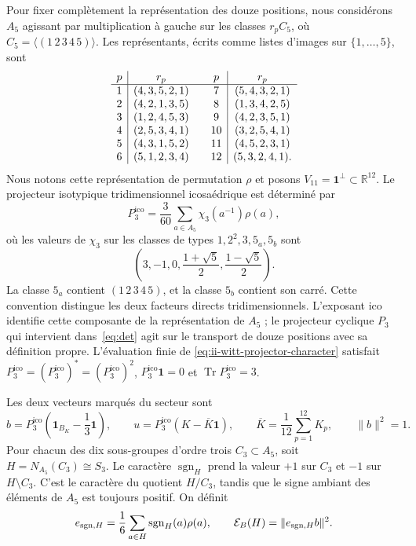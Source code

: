 Pour fixer complètement la représentation des douze positions,
nous considérons \(A_5\) agissant par multiplication à gauche sur les
classes \(r_pC_5\), où \(C_5=\langle(1\,2\,3\,4\,5)\rangle\).
Les représentants, écrits comme listes d’images sur
\(\{1,\ldots,5\}\), sont
\[
\begin{array}{c|c@{\qquad}c|c}
p&r_p&p&r_p\\ \hline
1&(4,3,5,2,1)&7&(5,4,3,2,1)\\
2&(4,2,1,3,5)&8&(1,3,4,2,5)\\
3&(1,2,4,5,3)&9&(4,2,3,5,1)\\
4&(2,5,3,4,1)&10&(3,2,5,4,1)\\
5&(4,3,1,5,2)&11&(4,5,2,3,1)\\
6&(5,1,2,3,4)&12&(5,3,2,4,1).
\end{array}
\]
Nous notons cette représentation de permutation \(\rho\) et posons
\(V_{11}=\mathbf1^\perp\subset\mathbb R^{12}\). Le projecteur
isotypique tridimensionnel icosaédrique est déterminé par
\begin{equation}
 P_3^{\mathrm{ico}}=\frac3{60}\sum_{a\in A_5}\chi_3(a^{-1})\rho(a),
 \label{eq:ii-witt-projector-character}
\end{equation}
où les valeurs de \(\chi_3\) sur les classes de types
\(1,2^2,3,5_a,5_b\) sont
\[
 \left(3,-1,0,\frac{1+\sqrt5}{2},\frac{1-\sqrt5}{2}\right).
\]
La classe \(5_a\) contient \((1\,2\,3\,4\,5)\), et la classe
\(5_b\) contient son carré. Cette convention distingue les deux
facteurs directs tridimensionnels. L’exposant \(\mathrm{ico}\) identifie
cette composante de la représentation de \(A_5\) ; le projecteur cyclique
\(P_3\) qui intervient dans~\eqref{eq:det} agit sur le transport de douze
positions avec sa définition propre. L’évaluation finie de
\eqref{eq:ii-witt-projector-character} satisfait
\(P_3^{\mathrm{ico}}=(P_3^{\mathrm{ico}})^*=(P_3^{\mathrm{ico}})^2\), \(P_3^{\mathrm{ico}}\mathbf1=0\) et
\(\operatorname{Tr}P_3^{\mathrm{ico}}=3\).

Les deux vecteurs marqués du secteur sont
\[
 b=P_3^{\mathrm{ico}}\left(\mathbf1_{B_K}-\frac13\mathbf1\right),
 \qquad u=P_3^{\mathrm{ico}}(K-\overline K\mathbf1),
 \qquad \overline K=\frac1{12}\sum_{p=1}^{12}K_p,
 \qquad \|b\|^2=1.
\]
Pour chacun des dix sous-groupes d’ordre trois \(C_3\subset A_5\),
soit \(H=N_{A_5}(C_3)\cong S_3\). Le caractère
\(\operatorname{sgn}_H\) prend la valeur \(+1\) sur \(C_3\) et
\(-1\) sur \(H\setminus C_3\). C’est le caractère du quotient
\(H/C_3\), tandis que le signe ambiant des éléments de \(A_5\)
est toujours positif. On définit
\begin{equation}
 e_{{\rm sgn},H}=\frac16\sum_{a\in H}\operatorname{sgn}_H(a)\rho(a),
 \qquad \mathcal E_B(H)=\|e_{{\rm sgn},H}b\|^2.
 \label{eq:ii-witt-energy}
\end{equation}

